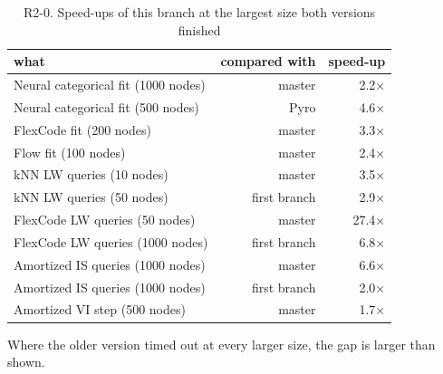 \begin{table}[H]\centering\small
\caption{R2-0. Speed-ups of this branch at the largest size both versions finished}\label{tab:r2sum}

\begin{tabular}{lrr}\toprule
what & compared with & speed-up \\ \midrule
Neural categorical fit (1000 nodes) & master & 2.2$\times$ \\
Neural categorical fit (500 nodes) & Pyro & 4.6$\times$ \\
FlexCode fit (200 nodes) & master & 3.3$\times$ \\
Flow fit (100 nodes) & master & 2.4$\times$ \\
kNN LW queries (10 nodes) & master & 3.5$\times$ \\
kNN LW queries (50 nodes) & first branch & 2.9$\times$ \\
FlexCode LW queries (50 nodes) & master & 27.4$\times$ \\
FlexCode LW queries (1000 nodes) & first branch & 6.8$\times$ \\
Amortized IS queries (1000 nodes) & master & 6.6$\times$ \\
Amortized IS queries (1000 nodes) & first branch & 2.0$\times$ \\
Amortized VI step (500 nodes) & master & 1.7$\times$ \\
\bottomrule\end{tabular}
\par\smallskip\footnotesize Where the older version timed out at every larger size, the gap is larger than shown.
\end{table}
